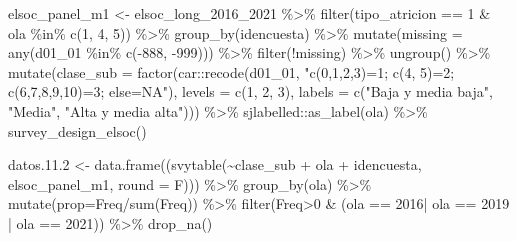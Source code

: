 \documentclass[
  12pt,
]{book}
\newenvironment{Shaded}{\begin{snugshade}}{\end{snugshade}}
\newcommand{\AttributeTok}[1]{\textcolor[rgb]{0.77,0.63,0.00}{#1}}
\newcommand{\DecValTok}[1]{\textcolor[rgb]{0.00,0.00,0.81}{#1}}
\newcommand{\FloatTok}[1]{\textcolor[rgb]{0.00,0.00,0.81}{#1}}
\newcommand{\FunctionTok}[1]{\textcolor[rgb]{0.00,0.00,0.00}{#1}}
\newcommand{\NormalTok}[1]{#1}
\newcommand{\OtherTok}[1]{\textcolor[rgb]{0.56,0.35,0.01}{#1}}
\newcommand{\SpecialCharTok}[1]{\textcolor[rgb]{0.00,0.00,0.00}{#1}}
\newcommand{\StringTok}[1]{\textcolor[rgb]{0.31,0.60,0.02}{#1}}
\begin{document}
\begin{Shaded}
\begin{Highlighting}[]
\NormalTok{elsoc\_panel\_m1 }\OtherTok{\textless{}{-}}\NormalTok{ elsoc\_long\_2016\_2021 }\SpecialCharTok{\%\textgreater{}\%} 
  \FunctionTok{filter}\NormalTok{(tipo\_atricion }\SpecialCharTok{==} \DecValTok{1} \SpecialCharTok{\&}\NormalTok{ ola }\SpecialCharTok{\%in\%} \FunctionTok{c}\NormalTok{(}\DecValTok{1}\NormalTok{, }\DecValTok{4}\NormalTok{, }\DecValTok{5}\NormalTok{)) }\SpecialCharTok{\%\textgreater{}\%} 
  \FunctionTok{group\_by}\NormalTok{(idencuesta) }\SpecialCharTok{\%\textgreater{}\%} 
  \FunctionTok{mutate}\NormalTok{(}\AttributeTok{missing =} \FunctionTok{any}\NormalTok{(d01\_01 }\SpecialCharTok{\%in\%} \FunctionTok{c}\NormalTok{(}\SpecialCharTok{{-}}\DecValTok{888}\NormalTok{, }\SpecialCharTok{{-}}\DecValTok{999}\NormalTok{))) }\SpecialCharTok{\%\textgreater{}\%} 
  \FunctionTok{filter}\NormalTok{(}\SpecialCharTok{!}\NormalTok{missing) }\SpecialCharTok{\%\textgreater{}\%} 
  \FunctionTok{ungroup}\NormalTok{() }\SpecialCharTok{\%\textgreater{}\%} 
  \FunctionTok{mutate}\NormalTok{(}\AttributeTok{clase\_sub =} \FunctionTok{factor}\NormalTok{(car}\SpecialCharTok{::}\FunctionTok{recode}\NormalTok{(d01\_01, }\StringTok{"c(0,1,2,3)=1; c(4, 5)=2; c(6,7,8,9,10)=3; else=NA"}\NormalTok{), }
                            \AttributeTok{levels =} \FunctionTok{c}\NormalTok{(}\DecValTok{1}\NormalTok{, }\DecValTok{2}\NormalTok{, }\DecValTok{3}\NormalTok{), }
                            \AttributeTok{labels =} \FunctionTok{c}\NormalTok{(}\StringTok{"Baja y media baja"}\NormalTok{, }\StringTok{"Media"}\NormalTok{, }\StringTok{"Alta y media alta"}\NormalTok{))) }\SpecialCharTok{\%\textgreater{}\%}
\NormalTok{  sjlabelled}\SpecialCharTok{::}\FunctionTok{as\_label}\NormalTok{(ola) }\SpecialCharTok{\%\textgreater{}\%} 
  \FunctionTok{survey\_design\_elsoc}\NormalTok{()}

\NormalTok{datos.}\FloatTok{11.2} \OtherTok{\textless{}{-}} \FunctionTok{data.frame}\NormalTok{((}\FunctionTok{svytable}\NormalTok{(}\SpecialCharTok{\textasciitilde{}}\NormalTok{clase\_sub }\SpecialCharTok{+}\NormalTok{ ola }\SpecialCharTok{+}\NormalTok{ idencuesta, elsoc\_panel\_m1, }\AttributeTok{round =}\NormalTok{ F))) }\SpecialCharTok{\%\textgreater{}\%} 
  \FunctionTok{group\_by}\NormalTok{(ola) }\SpecialCharTok{\%\textgreater{}\%} \FunctionTok{mutate}\NormalTok{(}\AttributeTok{prop=}\NormalTok{Freq}\SpecialCharTok{/}\FunctionTok{sum}\NormalTok{(Freq)) }\SpecialCharTok{\%\textgreater{}\%}
  \FunctionTok{filter}\NormalTok{(Freq}\SpecialCharTok{\textgreater{}}\DecValTok{0} \SpecialCharTok{\&}\NormalTok{ (ola }\SpecialCharTok{==} \StringTok{\textquotesingle{}2016\textquotesingle{}}\SpecialCharTok{|}\NormalTok{ ola }\SpecialCharTok{==} \StringTok{\textquotesingle{}2019\textquotesingle{}} \SpecialCharTok{|}\NormalTok{ ola }\SpecialCharTok{==} \StringTok{\textquotesingle{}2021\textquotesingle{}}\NormalTok{)) }\SpecialCharTok{\%\textgreater{}\%}
  \FunctionTok{drop\_na}\NormalTok{()}


\end{Highlighting}
\end{Shaded}
\end{document}
